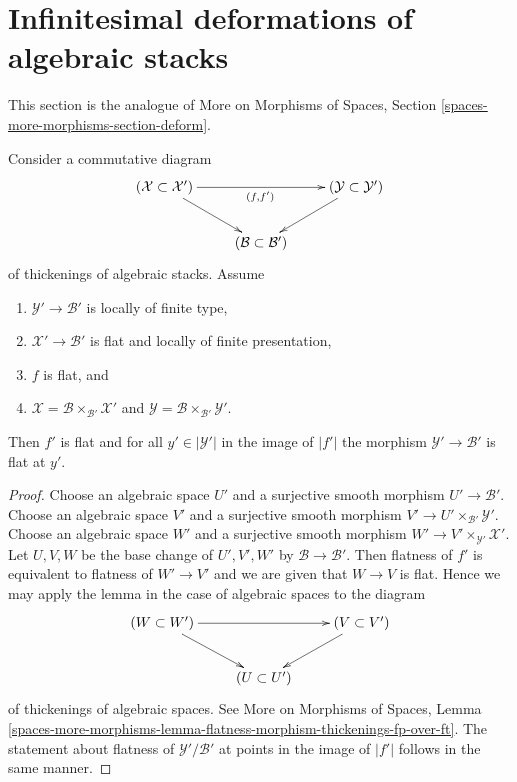 \section{Infinitesimal deformations of algebraic stacks}
\label{section-deform}

\noindent
This section is the analogue of
More on Morphisms of Spaces, Section
\ref{spaces-more-morphisms-section-deform}.

\begin{lemma}
\label{lemma-flatness-morphism-thickenings-fp-over-ft}
Consider a commutative diagram
$$
\xymatrix{
(\mathcal{X} \subset \mathcal{X}') \ar[rr]_{(f, f')} \ar[rd] & &
(\mathcal{Y} \subset \mathcal{Y}') \ar[ld] \\
& (\mathcal{B} \subset \mathcal{B}')
}
$$
of thickenings of algebraic stacks. Assume
\begin{enumerate}
\item $\mathcal{Y}' \to \mathcal{B}'$ is locally of finite type,
\item $\mathcal{X}' \to \mathcal{B}'$ is
flat and locally of finite presentation,
\item $f$ is flat, and
\item $\mathcal{X} = \mathcal{B} \times_{\mathcal{B}'} \mathcal{X}'$ and
$\mathcal{Y} = \mathcal{B} \times_{\mathcal{B}'} \mathcal{Y}'$.
\end{enumerate}
Then $f'$ is flat and for all $y' \in |\mathcal{Y}'|$ in the image of $|f'|$
the morphism $\mathcal{Y}' \to \mathcal{B}'$ is flat at $y'$.
\end{lemma}

\begin{proof}
Choose an algebraic space $U'$ and a surjective smooth morphism
$U' \to \mathcal{B}'$.
Choose an algebraic space $V'$ and a surjective smooth morphism
$V' \to U' \times_{\mathcal{B}'} \mathcal{Y}'$.
Choose an algebraic space $W'$ and a surjective smooth morphism
$W' \to V' \times_{\mathcal{Y}'} \mathcal{X}'$. Let $U, V, W$
be the base change of $U', V', W'$ by $\mathcal{B} \to \mathcal{B}'$.
Then flatness of $f'$ is equivalent to flatness of $W' \to V'$ and
we are given that $W \to V$ is flat. Hence we may apply the lemma
in the case of algebraic spaces to the diagram
$$
\xymatrix{
(W \subset W') \ar[rr] \ar[rd] & & (V \subset V') \ar[ld] \\
& (U \subset U')
}
$$
of thickenings of algebraic spaces. See
More on Morphisms of Spaces, Lemma
\ref{spaces-more-morphisms-lemma-flatness-morphism-thickenings-fp-over-ft}.
The statement about flatness of $\mathcal{Y}'/\mathcal{B}'$ at points in the
image of $|f'|$ follows in the same manner.
\end{proof}

